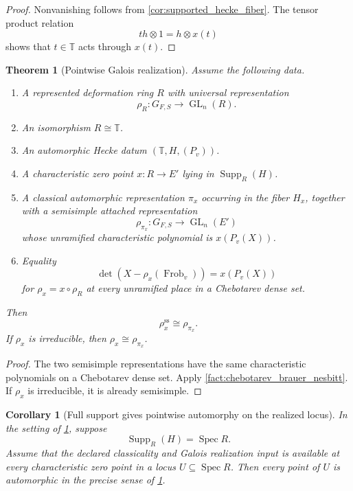 \documentclass{aomart}
\newtheorem{theorem}{Theorem}[section]
\newtheorem{corollary}[corollary]{Corollary}
\theoremstyle{definition}
\theoremstyle{remark}
\newcommand{\TT}{\mathbb T}
\newcommand{\Spec}{\operatorname{Spec}}
\newcommand{\Supp}{\operatorname{Supp}}
\newcommand{\Frob}{\operatorname{Frob}}
\newcommand{\GL}{\operatorname{GL}}
\begin{document}
\begin{proof}
Nonvanishing follows from \cref{cor:supported_hecke_fiber}. The tensor product relation
\[
th\otimes1=h\otimes x(t)
\]
shows that \(t\in\TT\) acts through \(x(t)\).
\end{proof}

\begin{theorem}[Pointwise Galois realization]\label{thm:pointwise_galois_realization}
Assume the following data.
\begin{enumerate}
\item A represented deformation ring \(R\) with universal representation
\[
\rho_R:G_{F,S}\longrightarrow\GL_n(R).
\]
\item An isomorphism \(R\cong\TT\).
\item An automorphic Hecke datum \((\TT,H,(P_v))\).
\item A characteristic zero point \(x:R\to E'\) lying in \(\Supp_R(H)\).
\item A classical automorphic representation \(\pi_x\) occurring in the fiber \(H_x\), together with a semisimple attached representation
\[
\rho_{\pi_x}:G_{F,S}\longrightarrow\GL_n(E')
\]
whose unramified characteristic polynomial is \(x(P_v(X))\).
\item Equality
\[
\det\left(X-\rho_x(\Frob_v)\right)=x(P_v(X))
\]
for \(\rho_x=x\circ\rho_R\) at every unramified place in a Chebotarev dense set.
\end{enumerate}
Then
\[
\boxed{
\rho_x^{\mathrm{ss}}
\cong
\rho_{\pi_x}.
}
\]
If \(\rho_x\) is irreducible, then \(\rho_x\cong\rho_{\pi_x}\).
\end{theorem}

\begin{proof}
The two semisimple representations have the same characteristic polynomials on a Chebotarev dense set. Apply \cref{fact:chebotarev_brauer_nesbitt}. If \(\rho_x\) is irreducible, it is already semisimple.
\end{proof}

\begin{corollary}[Full support gives pointwise automorphy on the realized locus]\label{cor:full_support_pointwise_automorphy}
In the setting of \cref{thm:pointwise_galois_realization}, suppose
\[
\Supp_R(H)=\Spec R.
\]
Assume that the declared classicality and Galois realization input is available at every characteristic zero point in a locus \(U\subseteq\Spec R\). Then every point of \(U\) is automorphic in the precise sense of \cref{thm:pointwise_galois_realization}.
\end{corollary}
\end{document}
